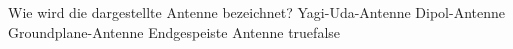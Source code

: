     {Wie wird die dargestellte Antenne bezeichnet?}
    {Yagi-Uda-Antenne}
    {Dipol-Antenne}
    {Groundplane-Antenne}
    {Endgespeiste Antenne}
    {true}{false}